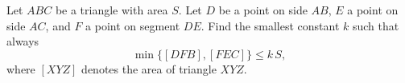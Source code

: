 Let $ABC$ be a triangle with area $S$. Let $D$ be a point on side $AB$, $E$ a point on side $AC$, and $F$ a point on segment $DE$. Find the smallest constant $k$ such that always
\[
\min\{[DFB],[FEC]\}\le k\,S ,
\]
where $[XYZ]$ denotes the area of triangle $XYZ$.
